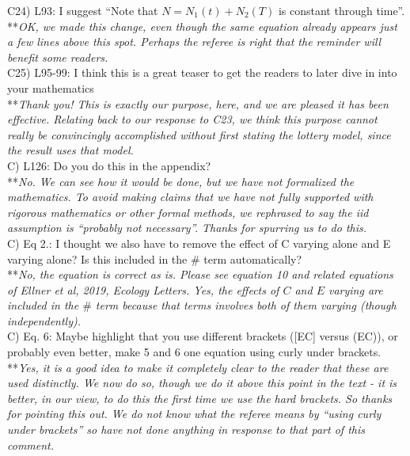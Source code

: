 \documentclass[letterpaper,11pt]{article}
\begin{document}
\noindent C24) L93: I suggest ``Note that $N = N_1(t) + N_2(T)$ is constant through time''. \\

\noindent ***\emph{OK, we made this change, even though the same equation already appears just a few lines
above this spot. Perhaps the referee is right that the reminder will benefit some readers.} \\

\noindent C25) L95-99: I think this is a great teaser to get the readers to later dive in into your mathematics \\

\noindent ***\emph{Thank you! This is exactly our purpose, here, and we are pleased it has been effective.
Relating back to our response to C23, we think this purpose cannot really be convincingly accomplished
without first stating the lottery model, since the result uses that model. } \\

\noindent C) L126: Do you do this in the appendix? \\

\noindent ***\emph{No. We can see how it would be done, but we have not formalized the mathematics. 
To avoid making claims that we have not fully supported
with rigorous mathematics or other formal methods, we rephrased to say the iid assumption is 
``probably not necessary''. Thanks for spurring us to do this.} \\

\noindent C) Eq 2.: I thought we also have to remove the effect of C varying alone and E varying alone? Is this included in the $\#$ term automatically? \\

\noindent ***\emph{No, the equation is correct as is. Please see equation 10 and related equations of 
Ellner et al, 2019, Ecology Letters. Yes, the effects of $C$ and $E$ varying are included in 
the $\#$ term because that terms involves both of them varying (though independently).} \\

\noindent C) Eq. 6: Maybe highlight that you use different brackets ([EC] versus (EC)), or probably even better, make 5 and 6 one equation using curly under brackets. \\

\noindent ***\emph{Yes, it is a good idea to make it completely clear to the reader that these are 
used distinctly. We now do so, though we do it above this point in the text - it is better, in our view,
to do this the first time we use the hard brackets. So thanks for pointing this out.
We do not know what the referee means by ``using curly under brackets'' so have not done anything
in response to that part of this comment.} \\
\end{document}
